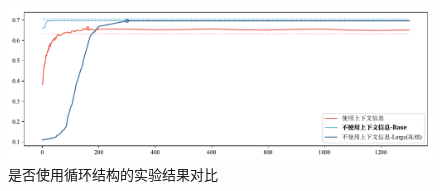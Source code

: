 \begin{figure}[htb]
	\centering
	\includegraphics[width=0.75\linewidth]{images/对话上下文.pdf}
	\caption{是否使用循环结构的实验结果对比}
	\label{fig:context}
\end{figure}